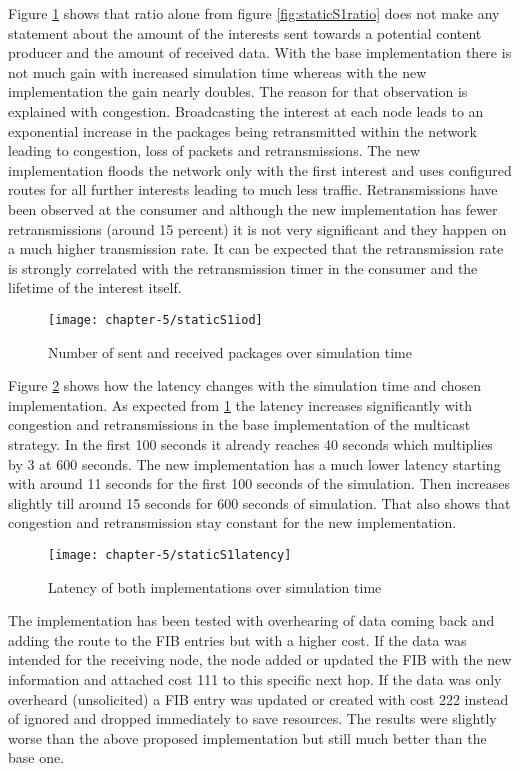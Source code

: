 Figure \ref{fig:staticS1iod} shows that ratio alone from figure \ref{fig:staticS1ratio} does not make any statement about the amount of the interests sent towards a potential content producer and the amount of received data. With the base implementation there is not much gain with increased simulation time whereas with the new implementation the gain nearly doubles. The reason for that observation is explained with congestion. Broadcasting the interest at each node leads to an exponential increase in the packages being retransmitted within the network leading to congestion, loss of packets and retransmissions. The new implementation floods the network only with the first interest and uses configured routes for all further interests leading to much less traffic. Retransmissions have been observed at the consumer and although the new implementation has fewer retransmissions (around 15 percent) it is not very significant and they happen on a much higher transmission rate. It can be expected that the retransmission rate is strongly correlated with the retransmission timer in the consumer and the lifetime of the interest itself.

\begin{figure}[H]
  \centering
  \texttt{[image: chapter-5/staticS1iod]}
  \caption{Number of sent and received packages over simulation time}
  \label{fig:staticS1iod}
\end{figure}

Figure \ref{fig:staticS1latency} shows how the latency changes with the simulation time and chosen implementation. As expected from \ref{fig:staticS1iod} the latency increases significantly with congestion and retransmissions in the base implementation of the multicast strategy. In the first 100 seconds it already reaches 40 seconds which multiplies by 3 at 600 seconds. The new implementation has a much lower latency starting with around 11 seconds for the first 100 seconds of the simulation. Then increases slightly till around 15 seconds for 600 seconds of simulation. That also shows that congestion and retransmission stay constant for the new implementation.

\begin{figure}[H]
  \centering
  \texttt{[image: chapter-5/staticS1latency]}
  \caption{Latency of both implementations over simulation time}
  \label{fig:staticS1latency}
\end{figure}

The implementation has been tested with overhearing of data coming back and adding the route to the FIB entries but with a higher cost. If the data was intended for the receiving node, the node added or updated the FIB with the new information and attached cost 111 to this specific next hop. If the data was only overheard (unsolicited) a FIB entry was updated or created with cost 222 instead of ignored and dropped immediately to save resources. The results were slightly worse than the above proposed implementation but still much better than the base one.

